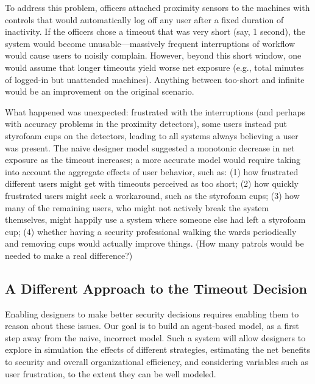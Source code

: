 \documentclass{acm_proc_article-sp}
\newcommand{\ignore}[1] {}
\begin{document}
\ignore{To address this problem, the officers attached proximity sensors to the machines and added controls that,
when detecting that a computer had been left unattended but logged-in for a predetermined, fixed, period of time, the user would be automatically logged off.}
To address this problem, officers attached proximity sensors to the machines 
with controls that would automatically log off any user after a fixed 
duration of inactivity.
If the officers chose a timeout that was very short (say, 1 second),
the system would become unusable---massively frequent interruptions of workflow would cause users to noisily complain.  
However, beyond this short window, one would assume that longer timeouts
yield worse net exposure (e.g., total minutes of logged-in but unattended machines).   Anything between too-short and infinite would be an improvement 
on the original scenario.

What happened was unexpected: frustrated with the interruptions (and
perhaps with accuracy problems in the proximity detectors), some users
instead put styrofoam cups on the detectors, leading to all systems
always believing a user was present.  The naive designer model
suggested a monotonic decrease in net exposure as the timeout
increases; a more
accurate model would require taking into account the aggregate effects
of user behavior, such as: (1) how frustrated different users might
get with timeouts perceived as too short; (2) how quickly frustrated
users might seek a workaround, such as the styrofoam cups; (3) how
many of the remaining users, who might not actively break the system
themselves, might happily use a system where someone else had left a
styrofoam cup; (4) whether having a security professional walking the
wards periodically and removing cups would actually improve things.
(How many patrols would be needed to make a real difference?)

\subsection{A Different Approach to the Timeout Decision}

Enabling designers to make better security decisions requires enabling
them to reason about these issues.  Our goal is to build an
agent-based model, as a first step away from the naive, incorrect
model. Such a system will allow designers to explore in simulation the
effects of different strategies, estimating the net benefits to
security and overall organizational efficiency, and considering
variables such as user frustration, to the extent they can be well
modeled.
\end{document}

